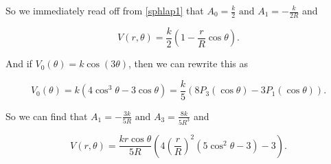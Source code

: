 \documentclass[english,a4paper,12pt]{report}
\begin{document}
{So we immediately read off from \cref{sphlap1} that \(\displaystyle A_0 = \frac{k}{2} \text{ and }  A_1 = -\frac{k}{2R} \) and

\begin{equation}
    V(r,\theta )  = \frac{k}{2} (1 - \frac{r}{R} \cos \theta ).
\end{equation}	

And if \(V_0(\theta) = k\cos (3 \theta)\), then we can rewrite this as

\begin{equation}
    V_0(\theta) = k(4\cos ^3 \theta - 3\cos \theta) = \frac{k}{5} (8P_3 (\cos \theta) - 3P_1(\cos \theta)).
\end{equation}

So we can find that \(\displaystyle A_1 = -\frac{3k}{5R} \text{ and } A_3 = \frac{8k}{5R^3} \) and 

\begin{equation}
    V(r,\theta) = \frac{kr\cos \theta}{5R} \left(4\left(\frac{r}{R}\right)^2(5\cos ^2 \theta-3)-3\right). 
\end{equation}} 
\end{document}
